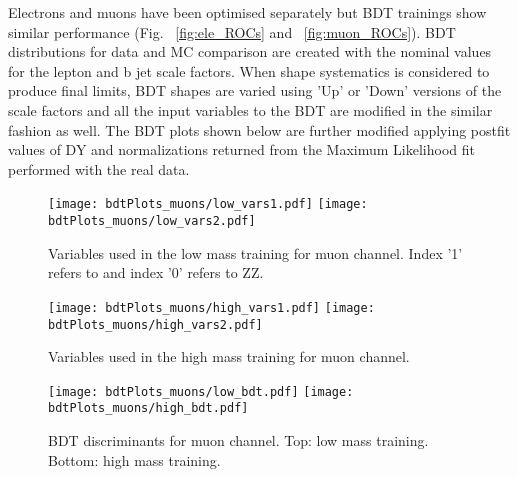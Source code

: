 Electrons and muons have been optimised separately but BDT trainings show similar performance (Fig. ~\ref{fig:ele_ROCs} and ~\ref{fig:muon_ROCs}). BDT distributions for data and MC comparison are created with the nominal values for the lepton and b jet scale factors. When shape systematics is considered to produce final limits, BDT shapes are
varied using 'Up' or 'Down' versions of the scale factors and all the input variables to the BDT are modified in the similar fashion as well. The BDT plots shown below are further modified applying postfit values of DY and \ttbar normalizations returned from the Maximum Likelihood fit performed with the real data. 






\begin{figure}[tbp]
  \begin{center}
   \texttt{[image: bdtPlots\_muons/low\_vars1.pdf]}
   \texttt{[image: bdtPlots\_muons/low\_vars2.pdf]}
    \caption{Variables used in the low mass training for muon channel. Index '1' refers to \bbbar and index '0' refers to ZZ.}
    \label{fig:muon_lowVars}
  \end{center}
\end{figure}



\begin{figure}[tbp]
  \begin{center}
   \texttt{[image: bdtPlots\_muons/high\_vars1.pdf]}
   \texttt{[image: bdtPlots\_muons/high\_vars2.pdf]}
    \caption{ Variables used in the high mass training for muon channel.}
    \label{fig:muon_highVars}
  \end{center}
\end{figure}


\begin{figure}[tbp]
  \begin{center}
   \texttt{[image: bdtPlots\_muons/low\_bdt.pdf]}
   \texttt{[image: bdtPlots\_muons/high\_bdt.pdf]}
    \caption{ BDT discriminants for muon channel. Top: low mass training. Bottom: high mass training. }
    \label{fig:muon_BDTs}
  \end{center}
\end{figure}

